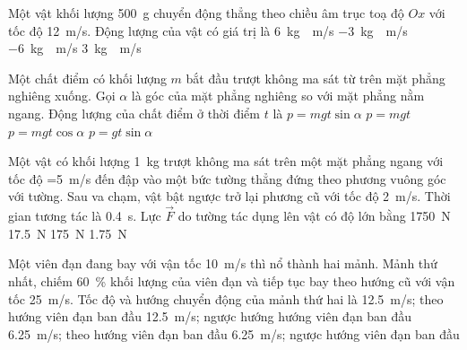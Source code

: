 \begin{ex}
	Một vật khối lượng \SI{500}{\gram} chuyển động thẳng theo chiều âm trục toạ độ $Ox$ với tốc độ \SI{12}{\meter/\second}. Động lượng của vật có giá trị là
	\choice
	{\SI{6}{\kilogram\cdot\meter/\second}}
	{\SI{-3}{\kilogram\cdot\meter/\second}}
	{\True \SI{-6}{\kilogram\cdot\meter/\second}}
	{\SI{3}{\kilogram\cdot\meter/\second}}
	\loigiai{}
\end{ex}
\begin{ex}
	Một chất điểm có khối lượng $m$ bắt đầu trượt không ma sát từ trên mặt phẳng nghiêng xuống. Gọi $\alpha$ là góc của mặt phẳng nghiêng so với mặt phẳng nằm ngang. Động lượng của chất điểm ở thời điểm $t$ là
	\choice
	{\True $p=mgt\sin\alpha$}
	{$p=mgt$}
	{$p=mgt\cos\alpha$}
	{$p=gt\sin\alpha$}
	\loigiai{}
\end{ex}
\begin{ex}
	Một vật có khối lượng \SI{1}{\kilogram} trượt không ma sát trên một mặt phẳng ngang với tốc độ =\SI{5}{\meter/\second} đến đập vào một bức tường thẳng đứng theo phương vuông góc với tường. Sau va chạm, vật bật ngược trở lại phương cũ với tốc độ \SI{2}{\meter/\second}. Thời gian tương tác là \SI{0.4}{\second}. Lực $\vec{F}$ do tường tác dụng lên vật có độ lớn bằng
	\choice
	{\SI{1750}{\newton}}
	{\True \SI{17.5}{\newton}}
	{\SI{175}{\newton}}
	{\SI{1.75}{\newton}}
	\loigiai{}
\end{ex}

\begin{ex}
	Một viên đạn đang bay với vận tốc \SI{10}{\meter/\second} thì nổ thành hai mảnh. Mảnh thứ nhất, chiếm \SI{60}{\percent} khối lượng của viên đạn và tiếp tục bay theo hướng cũ với vận tốc \SI{25}{\meter/\second}. Tốc độ và hướng chuyển động của mảnh thứ hai là
	\choice
	{\SI{12.5}{\meter/\second}; theo hướng viên đạn ban đầu}
	{\True\SI{12.5}{\meter/\second}; ngược hướng hướng viên đạn ban đầu}
	{\SI{6.25}{\meter/\second}; theo hướng viên đạn ban đầu}
	{\SI{6.25}{\meter/\second}; ngược hướng viên đạn ban đầu}
	\loigiai{}
\end{ex}
